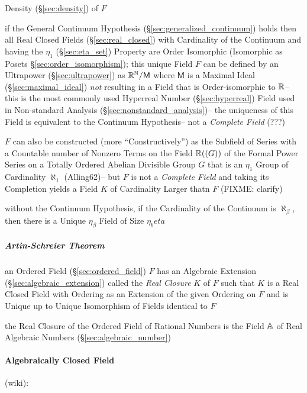 Density (\S\ref{sec:density}) of $F$

if the General Continuum Hypothesis (\S\ref{sec:generalized_continuum}) holds
then all Real Closed Fields (\S\ref{sec:real_closed}) with Cardinality of the
Continuum and having the $\eta_1$ (\S\ref{sec:eta_set}) Property are Order
Isomorphic (Isomorphic as Posets \S\ref{sec:order_isomorphism});
this unique Field $F$ can be defined by an Ultrapower (\S\ref{sec:ultrapower})
as $\mathbb{R}^{\mathbb{N}} / \mathsf{M}$ where $\mathsf{M}$ is a Maximal Ideal
(\S\ref{sec:maximal_ideal}) \emph{not} resulting in a Field that is
Order-isomorphic to $\mathbb{R}$-- this is the most commonly used Hyperreal Number
(\S\ref{sec:hyperreal}) Field used in Non-standard Analysis
(\S\ref{sec:nonstandard_analysis})-- the uniqueness of this Field is equivalent
to the Continuum Hypothesis-- not a \emph{Complete Field} (???) %

$F$ can also be constructed (more ``Constructively'') as the Subfield of Series
with a Countable number of Nonzero Terms on the Field $\mathbb{R}((G))$ of the
Formal Power Series on a Totally Ordered Abelian Divisible Group $G$ that is an
$\eta_1$ Group of Cardinality $\aleph_1$ (Alling62)-- but $F$ is not a
\emph{Complete Field} and taking its Completion yields a Field $K$ of
Cardinality Larger thatn $F$ (FIXME: clarify)

without the Continuum Hypothesis, if the Cardinality of the Continuum is
$\aleph_\beta$, then there is a Unique $\eta_\beta$ Field of Size $\eta_beta$



\subparagraph{Artin-Schreier Theorem}\label{sec:artin_schreier}\hfill

an Ordered Field (\S\ref{sec:ordered_field}) $F$ has an Algebraic Extension
(\S\ref{sec:algebraic_extension}) called the \emph{Real Closure} $K$ of $F$
such that $K$ is a Real Closed Field with Ordering as an Extension of the given
Ordering on $F$ and is Unique up to Unique Isomorphism of Fields identical to
$F$

the Real Closure of the Ordered Field of Rational Numbers is the Field
$\mathbb{A}$ of Real Algebraic Numbers (\S\ref{sec:algebraic_number})



\paragraph{Algebraically Closed Field}\label{sec:algebraically_closed}
\hfill

(wiki):

